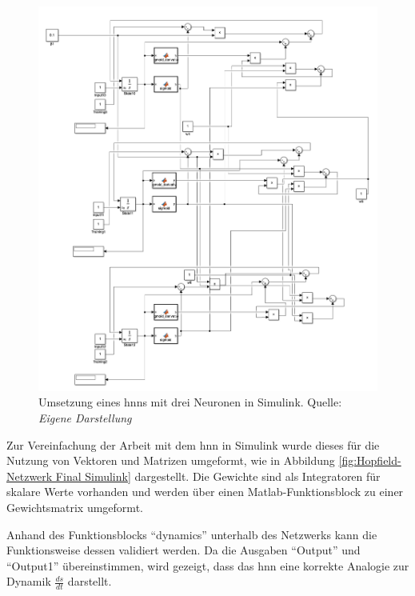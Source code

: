 \begin{figure}[h]
  \includegraphics[width=\textwidth]{abbildungen/hnn_without_bias_with_cost_3_neurons_simulink.png}
  \caption{Umsetzung eines \ac{hnn}s mit drei Neuronen in Simulink. Quelle: \textit{Eigene Darstellung}}
  \label{fig:Hopfield-Netzwerk 3 Neuronen Simulink}
\end{figure}

Zur Vereinfachung der Arbeit mit dem \ac{hnn} in Simulink wurde dieses für die Nutzung von Vektoren und Matrizen umgeformt, wie in Abbildung \ref{fig:Hopfield-Netzwerk Final Simulink} dargestellt. Die Gewichte sind als Integratoren für skalare Werte vorhanden und werden über einen Matlab-Funktionsblock zu einer Gewichtsmatrix umgeformt.

Anhand des Funktionsblocks "`dynamics"' unterhalb des Netzwerks kann die Funktionsweise dessen validiert werden. Da die Ausgaben "`Output"' und "`Output1"' übereinstimmen, wird gezeigt, dass das \ac{hnn} eine korrekte Analogie zur Dynamik \(\frac{ds}{dt}\) darstellt.

